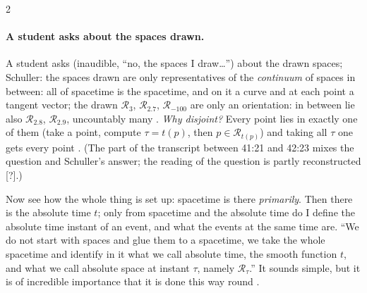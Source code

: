 \begin{paracol}{2}
\paragraph{A student asks about the spaces drawn.}\label{par:nk-student} A student asks (inaudible, ``no, the spaces I draw\dots'') about the drawn spaces; Schuller: the spaces drawn are only
representatives of the \emph{continuum} of spaces in between: all of spacetime is the spacetime, and on it a curve and at each point a tangent vector; the drawn $\mathcal R_3$, $\mathcal R_{2.7}$, $\mathcal R_{-100}$ are only an orientation: in between lie also
$\mathcal R_{2.8}$, $\mathcal R_{2.9}$, uncountably many . \emph{Why disjoint?} Every point lies in exactly one of them (take a point, compute $\tau=t(p)$, then $p\in\mathcal R_{t(p)}$) and
taking all $\tau$ one gets every point . (The part of the transcript between 41:21 and 42:23 mixes the question and Schuller's answer; the reading of the
question is partly reconstructed [?].)

Now see how the whole thing is set up: spacetime is there \emph{primarily}. Then there is the absolute time $t$; only from spacetime and the absolute time do I define the absolute time instant of an event, and what the events at the same time are. ``We do not
start with spaces and glue them to a spacetime, we take the whole spacetime and identify in it what we call absolute time, the smooth function $t$, and what we call absolute space at instant $\tau$,
namely $\mathcal R_\tau$.'' It sounds simple, but it is of incredible importance that it is done this way round .


\end{paracol}
